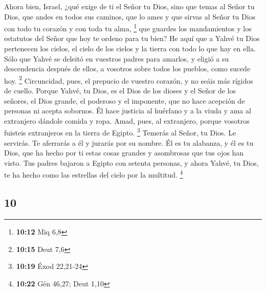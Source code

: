 \begin{paracol}{2}
 Ahora bien, Israel, ¿qué exige de ti el Señor tu Dios,
sino que temas al Señor tu Dios, que andes en todos sus caminos, que lo
ames y que sirvas al Señor tu Dios con todo tu corazón y con toda tu
alma, \footnote{\textbf{10:12} Miq 6,8}  que guardes los
mandamientos y los estatutos del Señor que hoy te ordeno para tu bien?
 He aquí que a Yahvé tu Dios pertenecen los cielos, el
cielo de los cielos y la tierra con todo lo que hay en ella.
 Sólo que Yahvé se deleitó en vuestros padres para
amarlos, y eligió a su descendencia después de ellos, a vosotros sobre
todos los pueblos, como sucede hoy. \footnote{\textbf{10:15} Deut 7,6}
 Circuncidad, pues, el prepucio de vuestro corazón, y no
seáis más rígidos de cuello.  Porque Yahvé, tu Dios, es
el Dios de los dioses y el Señor de los señores, el Dios grande, el
poderoso y el imponente, que no hace acepción de personas ni acepta
sobornos.  Él hace justicia al huérfano y a la viuda y
ama al extranjero dándole comida y ropa.  Amad, pues, al
extranjero, porque vosotros fuisteis extranjeros en la tierra de Egipto.
\footnote{\textbf{10:19} Éxod 22,21-24}  Temerás al
Señor, tu Dios. Le servirás. Te aferrarás a él y jurarás por su nombre.
 Él es tu alabanza, y él es tu Dios, que ha hecho por ti
estas cosas grandes y asombrosas que tus ojos han visto. 
Tus padres bajaron a Egipto con setenta personas, y ahora Yahvé, tu
Dios, te ha hecho como las estrellas del cielo por la multitud.
\footnote{\textbf{10:22} Gén 46,27; Deut 1,10}

\switchcolumn
\begin{otherlanguage}{english}

\hypertarget{section-19}{%
\section{10}\label{section-19}}


\end{otherlanguage}
\end{paracol}
